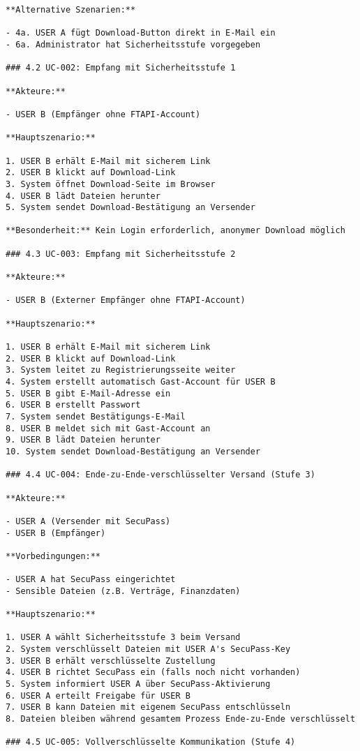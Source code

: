 \begin{Verbatim}[breaklines=true]
**Alternative Szenarien:**

- 4a. USER A fügt Download-Button direkt in E-Mail ein
- 6a. Administrator hat Sicherheitsstufe vorgegeben

### 4.2 UC-002: Empfang mit Sicherheitsstufe 1

**Akteure:**

- USER B (Empfänger ohne FTAPI-Account)

**Hauptszenario:**

1. USER B erhält E-Mail mit sicherem Link
2. USER B klickt auf Download-Link
3. System öffnet Download-Seite im Browser
4. USER B lädt Dateien herunter
5. System sendet Download-Bestätigung an Versender

**Besonderheit:** Kein Login erforderlich, anonymer Download möglich

### 4.3 UC-003: Empfang mit Sicherheitsstufe 2

**Akteure:**

- USER B (Externer Empfänger ohne FTAPI-Account)

**Hauptszenario:**

1. USER B erhält E-Mail mit sicherem Link
2. USER B klickt auf Download-Link
3. System leitet zu Registrierungsseite weiter
4. System erstellt automatisch Gast-Account für USER B
5. USER B gibt E-Mail-Adresse ein
6. USER B erstellt Passwort
7. System sendet Bestätigungs-E-Mail
8. USER B meldet sich mit Gast-Account an
9. USER B lädt Dateien herunter
10. System sendet Download-Bestätigung an Versender

### 4.4 UC-004: Ende-zu-Ende-verschlüsselter Versand (Stufe 3)

**Akteure:**

- USER A (Versender mit SecuPass)
- USER B (Empfänger)

**Vorbedingungen:**

- USER A hat SecuPass eingerichtet
- Sensible Dateien (z.B. Verträge, Finanzdaten)

**Hauptszenario:**

1. USER A wählt Sicherheitsstufe 3 beim Versand
2. System verschlüsselt Dateien mit USER A's SecuPass-Key
3. USER B erhält verschlüsselte Zustellung
4. USER B richtet SecuPass ein (falls noch nicht vorhanden)
5. System informiert USER A über SecuPass-Aktivierung
6. USER A erteilt Freigabe für USER B
7. USER B kann Dateien mit eigenem SecuPass entschlüsseln
8. Dateien bleiben während gesamtem Prozess Ende-zu-Ende verschlüsselt

### 4.5 UC-005: Vollverschlüsselte Kommunikation (Stufe 4)


\end{Verbatim}
